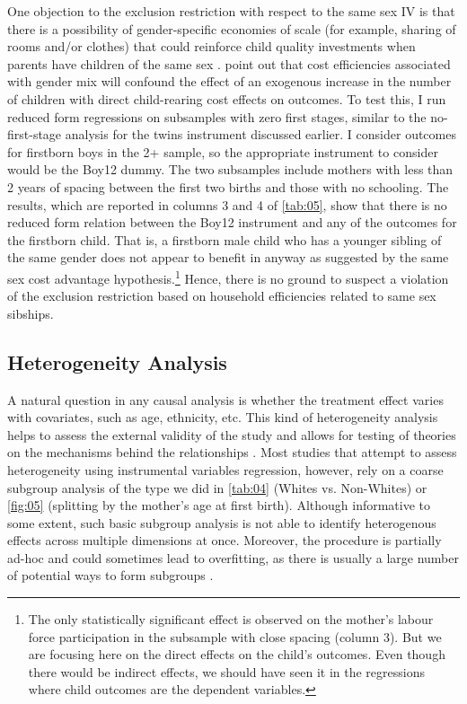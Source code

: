 One objection to the exclusion restriction with respect to the same sex IV is that there is a possibility of gender-specific economies of scale (for example, sharing of rooms and/or clothes) that could reinforce child quality investments when parents have children of the same sex \parencite{clarke_children_2018}. \textcite{rosenzweig_natural_2000} point out that cost efficiencies associated with gender mix will confound the effect of an exogenous increase in the number of children with direct child-rearing cost effects on outcomes. To test this, I run reduced form regressions on subsamples with zero first stages, similar to the no-first-stage analysis for the twins instrument discussed earlier. I consider outcomes for firstborn boys in the 2+ sample, so the appropriate instrument to consider would be the Boy12 dummy. The two subsamples include mothers with less than 2 years of spacing between the first two births and those with no schooling. The results, which are reported in columns 3 and 4 of \autoref{tab:05}, show that there is no reduced form relation between the Boy12 instrument and any of the outcomes for the firstborn child. That is, a firstborn male child who has a younger sibling of the same gender does not appear to benefit in anyway as suggested by the same sex cost advantage hypothesis.\footnote{ The only statistically significant effect is observed on the mother's labour force participation in the subsample with close spacing (column 3). But we are focusing here on the direct effects on the child’s outcomes. Even though there would be indirect effects, we should have seen it in the regressions where child outcomes are the dependent variables. } Hence, there is no ground to suspect a violation of the exclusion restriction based on household efficiencies related to same sex sibships. 


\subsection{Heterogeneity Analysis}

A natural question in any causal analysis is whether the treatment effect varies with covariates, such as age, ethnicity, etc. This kind of heterogeneity analysis helps to assess the external validity of the study and allows for testing of theories on the mechanisms behind the relationships \parencite[e.g.,][]{angrist_children_1998}. Most studies that attempt to assess heterogeneity using instrumental variables regression, however, rely on a coarse subgroup analysis of the type we did in \autoref{tab:04} (Whites vs. Non-Whites) or \autoref{fig:05} (splitting by the mother's age at first birth). Although informative to some extent, such basic subgroup analysis is not able to identify heterogenous effects across multiple dimensions at once. Moreover, the procedure is partially ad-hoc and could sometimes lead to overfitting, as there is usually a large number of potential ways to form subgroups \parencite{Chernozhukov2018}.

